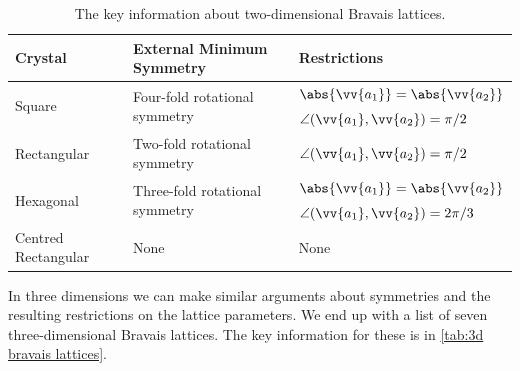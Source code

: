 \documentclass[fleqn]{NotesClass}
\begin{document}
    \begin{table}
        \caption[2D Bravais lattices.]{The key information about two-dimensional Bravais lattices.}
        \label{tab:2d bravais lattices}
        \begin{tabular}{lll}
            \toprule
            Crystal & External Minimum Symmetry & Restrictions\\ \midrule
            \multirow{2}{*}{Square} & \multirow{2}{*}{Four-fold rotational symmetry} & \(\abs{\vv{a_1}} = \abs{\vv{a_2}}\)\\
            && \(\angle(\vv{a_1},\vv{a_2}) = \pi/2\)\\\midrule
            Rectangular & Two-fold rotational symmetry & \(\angle(\vv{a_1},\vv{a_2}) = \pi/2\)\\\midrule
            \multirow{2}{*}{Hexagonal} & \multirow{2}{*}{Three-fold rotational symmetry} & \(\abs{\vv{a_1}} = \abs{\vv{a_2}}\)\\
            && \(\angle(\vv{a_1},\vv{a_2}) = 2\pi/3\)\\
            Centred Rectangular & None & None\\
            \bottomrule
        \end{tabular}
    \end{table}
    
    In three dimensions we can make similar arguments about symmetries and the resulting restrictions on the lattice parameters.
    We end up with a list of seven three-dimensional Bravais lattices.
    The key information for these is in \cref{tab:3d bravais lattices}.
    
\end{document}
